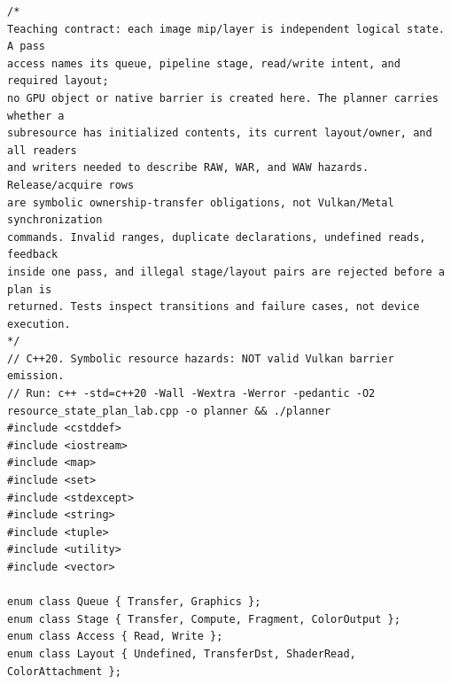 \begin{verbatim}
/*
Teaching contract: each image mip/layer is independent logical state. A pass
access names its queue, pipeline stage, read/write intent, and required layout;
no GPU object or native barrier is created here. The planner carries whether a
subresource has initialized contents, its current layout/owner, and all readers
and writers needed to describe RAW, WAR, and WAW hazards. Release/acquire rows
are symbolic ownership-transfer obligations, not Vulkan/Metal synchronization
commands. Invalid ranges, duplicate declarations, undefined reads, feedback
inside one pass, and illegal stage/layout pairs are rejected before a plan is
returned. Tests inspect transitions and failure cases, not device execution.
*/
// C++20. Symbolic resource hazards: NOT valid Vulkan barrier emission.
// Run: c++ -std=c++20 -Wall -Wextra -Werror -pedantic -O2 resource_state_plan_lab.cpp -o planner && ./planner
#include <cstddef>
#include <iostream>
#include <map>
#include <set>
#include <stdexcept>
#include <string>
#include <tuple>
#include <utility>
#include <vector>

enum class Queue { Transfer, Graphics };
enum class Stage { Transfer, Compute, Fragment, ColorOutput };
enum class Access { Read, Write };
enum class Layout { Undefined, TransferDst, ShaderRead, ColorAttachment };


\end{verbatim}
